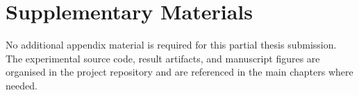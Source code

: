 
\chapter{Supplementary Materials}
\label{app:supplementary}

No additional appendix material is required for this partial thesis submission. The experimental source code, result artifacts, and manuscript figures are organised in the project repository and are referenced in the main chapters where needed.
